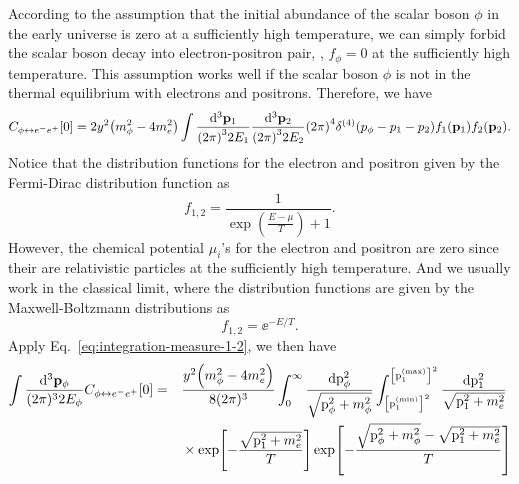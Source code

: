 \documentclass{article}
\begin{document}
        According to the assumption that the initial abundance of the scalar boson $\phi$ in the early universe is zero at a sufficiently high temperature, we can simply forbid the scalar boson decay into electron-positron pair, \ie, $f_\phi = 0$ at the sufficiently high temperature.
        This assumption works well if the scalar boson $\phi$ is not in the thermal equilibrium with electrons and positrons. 
        Therefore, we have
        \begin{equation}
            C_{\phi \leftrightarrow e^- e^+}[0] = 2 y^2 \qty(m_\phi^2 - 4 m_e^2) \int \frac{\dd[3]{\vb{p}_1}}{\qty(2 \pi)^3 2 E_1} \frac{\dd[3]{\vb{p}_2}}{\qty(2 \pi)^3 2 E_2} \qty(2 \pi)^4 \delta^{(4)}\qty(p_\phi - p_1 - p_2) f_1(\vb{p}_1) f_2(\vb{p}_2).
            \label{eq:collision-term-φee-0}
        \end{equation}
        Notice that the distribution functions for the electron and positron given by the Fermi-Dirac distribution function as
        \begin{equation}
            f_{1,2} = \frac{1}{\exp(\frac{E - \mu}{T}) + 1}.
        \end{equation}
        However, the chemical potential $\mu_i$'s for the electron and positron are zero since their are relativistic particles at the sufficiently high temperature.
        And we usually work in the classical limit, where the distribution functions are given by the Maxwell-Boltzmann distributions as
        \begin{equation}
            f_{1,2} = \ee^{-E / T}.
            \label{eq:Maxwell-Boltzmann-distribution-for-electron-and-positron}
        \end{equation}
        Apply Eq.~\eqref{eq:integration-measure-1-2}, we then have
        \begin{equation}
            \begin{aligned}
                \int \frac{\dd[3]{\vb{p}_\phi}}{(2 \pi)^3 2 E_\phi} C_{\phi \leftrightarrow e^- e^+}[0] & = && \frac{y^2 \qty(m_\phi^2 - 4 m_e^2)}{8 (2 \pi)^3} \int_0^\infty \frac{\dd{\mathrm{p}_\phi^2}}{\sqrt{\mathrm{p}_\phi^2 + m_\phi^2}} \int_{\qty[\mathrm{p}_1^\mathrm{(min)}]^2}^{\qty[\mathrm{p}_1^\mathrm{(max)}]^2} \frac{\dd{\mathrm{p}_1^2}}{\sqrt{\mathrm{p}_1^2 + m_e^2}} \\
                & && {} \times \exp[-\frac{\sqrt{\mathrm{p}_1^2 + m_e^2}}{T}] \exp[-\frac{\sqrt{\mathrm{p}_\phi^2 + m_\phi^2} - \sqrt{\mathrm{p}_1^2 + m_e^2}}{T}]
            \end{aligned}
        \end{equation}
\end{document}
